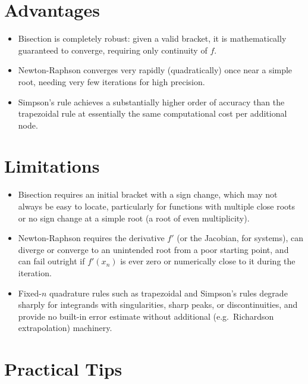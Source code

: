 \documentclass[
]{article}
\providecommand{\tightlist}{%
  \setlength{\itemsep}{0pt}\setlength{\parskip}{0pt}}
\begin{document}
\section{Advantages}\label{advantages}

\begin{itemize}
\tightlist
\item
  Bisection is completely robust: given a valid bracket, it is
  mathematically guaranteed to converge, requiring only continuity of
  \(f\).
\item
  Newton-Raphson converges very rapidly (quadratically) once near a
  simple root, needing very few iterations for high precision.
\item
  Simpson's rule achieves a substantially higher order of accuracy than
  the trapezoidal rule at essentially the same computational cost per
  additional node.
\end{itemize}

\section{Limitations}\label{limitations}

\begin{itemize}
\tightlist
\item
  Bisection requires an initial bracket with a sign change, which may
  not always be easy to locate, particularly for functions with multiple
  close roots or no sign change at a simple root (a root of even
  multiplicity).
\item
  Newton-Raphson requires the derivative \(f'\) (or the Jacobian, for
  systems), can diverge or converge to an unintended root from a poor
  starting point, and can fail outright if \(f'(x_n)\) is ever zero or
  numerically close to it during the iteration.
\item
  Fixed-\(n\) quadrature rules such as trapezoidal and Simpson's rules
  degrade sharply for integrands with singularities, sharp peaks, or
  discontinuities, and provide no built-in error estimate without
  additional (e.g.~Richardson extrapolation) machinery.
\end{itemize}

\section{Practical Tips}\label{practical-tips}
\end{document}
